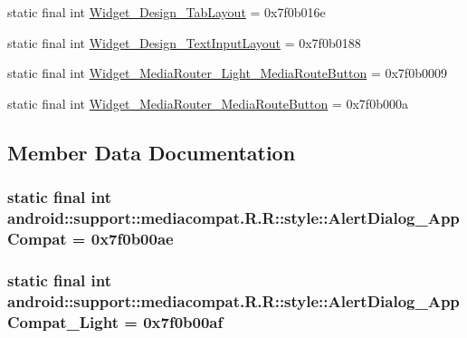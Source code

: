 \begin{CompactItemize}
static final int \hyperlink{classandroid_1_1support_1_1mediacompat_1_1_r_1_1style_37c83a05fbff7c20ff721ce7e86997b7}{Widget\_\-Design\_\-TabLayout} = 0x7f0b016e
\item 
static final int \hyperlink{classandroid_1_1support_1_1mediacompat_1_1_r_1_1style_3c1383ab461d2a4ab239245d3dbaa3dd}{Widget\_\-Design\_\-TextInputLayout} = 0x7f0b0188
\item 
static final int \hyperlink{classandroid_1_1support_1_1mediacompat_1_1_r_1_1style_c2b743bdbaa7ba1d39f0d3f58a0b2033}{Widget\_\-MediaRouter\_\-Light\_\-MediaRouteButton} = 0x7f0b0009
\item 
static final int \hyperlink{classandroid_1_1support_1_1mediacompat_1_1_r_1_1style_d65b9c0dfbde41d15707635419c1ebd8}{Widget\_\-MediaRouter\_\-MediaRouteButton} = 0x7f0b000a
\end{CompactItemize}


\subsection{Member Data Documentation}
\hypertarget{classandroid_1_1support_1_1mediacompat_1_1_r_1_1style_c6209b0a89a1568340e9e46e5691fd0a}{
\subsubsection[{AlertDialog\_\-AppCompat}]{\setlength{\rightskip}{0pt plus 5cm}static final int android::support::mediacompat.R.R::style::AlertDialog\_\-AppCompat = 0x7f0b00ae}}
\label{classandroid_1_1support_1_1mediacompat_1_1_r_1_1style_c6209b0a89a1568340e9e46e5691fd0a}


\hypertarget{classandroid_1_1support_1_1mediacompat_1_1_r_1_1style_5a89fc2bad2ce1226a87993a724dac00}{
\subsubsection[{AlertDialog\_\-AppCompat\_\-Light}]{\setlength{\rightskip}{0pt plus 5cm}static final int android::support::mediacompat.R.R::style::AlertDialog\_\-AppCompat\_\-Light = 0x7f0b00af}}
\label{classandroid_1_1support_1_1mediacompat_1_1_r_1_1style_5a89fc2bad2ce1226a87993a724dac00}


